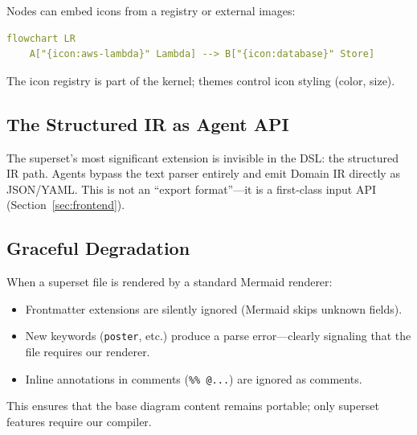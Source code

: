 Nodes can embed icons from a registry or external images:

\begin{lstlisting}[language=yaml,caption={Icon extension in flowchart}]
flowchart LR
    A["{icon:aws-lambda}" Lambda] --> B["{icon:database}" Store]
\end{lstlisting}

The icon registry is part of the kernel; themes control icon styling (color, size).

\subsection{The Structured IR as Agent API}

The superset's most significant extension is invisible in the DSL: the structured IR path.
Agents bypass the text parser entirely and emit Domain IR directly as JSON/YAML.
This is not an ``export format''---it is a first-class input API
(Section~\ref{sec:frontend}).

\subsection{Graceful Degradation}

When a superset file is rendered by a standard Mermaid renderer:
\begin{itemize}
  \item Frontmatter extensions are silently ignored (Mermaid skips unknown fields).
  \item New keywords (\texttt{poster}, etc.) produce a parse error---clearly signaling
        that the file requires our renderer.
  \item Inline annotations in comments (\texttt{\%\% @...}) are ignored as comments.
\end{itemize}

This ensures that the base diagram content remains portable; only superset features
require our compiler.
